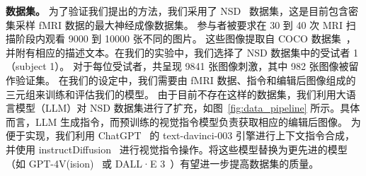 \textbf{数据集。} 为了验证我们提出的方法，我们采用了 NSD~\cite{allen2022massive} 数据集，这是目前包含密集采样 fMRI 数据的最大神经成像数据集。
参与者被要求在 30 到 40 次 MRI 扫描阶段内观看 9000 到 10000 张不同的图片。
这些图像提取自 COCO 数据集~\cite{lin2014microsoft}，并附有相应的描述文本。在我们的实验中，我们选择了 NSD 数据集中的受试者 1（subject 1）。
对于每位受试者，共呈现 9841 张图像刺激，其中 982 张图像被留作验证集。
在我们的设定中，我们需要由 fMRI 数据、指令和编辑后图像组成的三元组来训练和评估我们的模型。
由于目前不存在这样的数据集，我们利用大语言模型（LLM）对 NSD 数据集进行了扩充，如图~\ref{fig:data_pipeline} 所示。具体而言，LLM 生成指令，而预训练的视觉指令模型负责获取相应的编辑后图像。
为便于实现，我们利用 ChatGPT~\cite{brown2020language} 的 text-davinci-003 引擎进行上下文指令合成，并使用 instructDiffusion~\cite{geng2023instructdiffusion} 进行视觉指令操作。将这些模型替换为更先进的模型（如 GPT-4V(ision)~\cite{openai2023gpt} 或 DALL·E 3~\cite{openai2023dalle3}）有望进一步提高数据集的质量。

